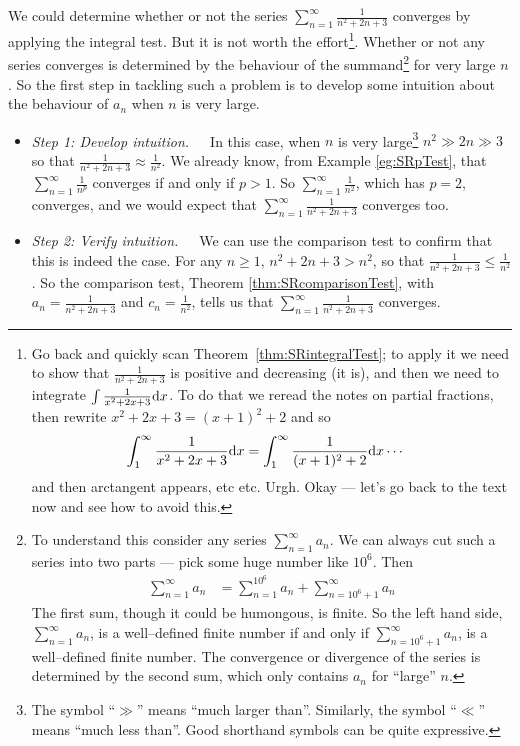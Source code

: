 \goodbreak
\begin{eg}[$\sum_{n=1}^\infty\frac{1}{n^2+2n+3}$]\label{eg:SRcomparisonTestA}
We could determine whether or not the series $\sum_{n=1}^\infty\frac{1}{n^2+2n+3}$
converges by applying the integral test. But it is not worth the effort\footnote{Go back and quickly scan
Theorem~\ref{thm:SRintegralTest}; to apply it we need to show that
$\frac{1}{n^2+2n+3}$ is  positive and decreasing (it is), and then
we need to integrate $\int \frac{1}{x^2+2x+3}\mathrm{d}x$. To do that
we reread the notes on partial fractions, then rewrite $x^2+2x+3
= (x+1)^2+2$ and so
\begin{align*}
  \int_1^\infty \frac{1}{x^2+2x+3}\mathrm{d}x
  &= \int_1^\infty \frac{1}{(x+1)^2+2}\mathrm{d}x \cdots
\end{align*}
and then arctangent appears,  etc etc. Urgh. Okay --- let's go
back to the text now and see how to avoid this.
}.
Whether or not any series converges is determined by the behaviour
of the summand\footnote{To understand this consider any series
$\sum_{n=1}^\infty a_n$. We can always cut such a series into
two parts --- pick some huge number like $10^6$. Then
\begin{align*}
\sum_{n=1}^\infty a_n
&= \sum_{n=1}^{10^6} a_n + \sum_{n=10^6+1}^\infty a_n
\end{align*}
The first sum, though it could be humongous, is finite. So
the left hand side, $\sum_{n=1}^\infty a_n$, is a well--defined finite
number if and only if $\sum_{n=10^6+1}^\infty a_n$, is a well--defined
finite number. The convergence or divergence of the series is
determined by the second sum, which  only contains $a_n$ for ``large'' $n$.}
for very large $n$. So the first step in tackling such
a problem is to develop some intuition about the behaviour of $a_n$ when
$n$ is very large.
\begin{itemize}
\item \emph{Step 1: Develop intuition.}\ \ \
In this case, when $n$ is very large\footnote{The symbol ``$\gg$''
means ``much larger than''. Similarly, the symbol ``$\ll$'' means ``much
less than''. Good shorthand symbols can be quite expressive.}
$n^2\gg 2n \gg 3$ so that  $\frac{1}{n^2+2n+3}\approx\frac{1}{n^2}$.
We already know, from Example \ref{eg:SRpTest}, that
$\sum_{n=1}^\infty\frac{1}{n^p}$ converges if and only if $p>1$.
So $\sum_{n=1}^\infty\frac{1}{n^2}$, which has $p=2$, converges, and
we would expect that
$\sum_{n=1}^\infty\frac{1}{n^2+2n+3}$ converges too.
\item \emph{Step 2: Verify intuition.}\ \ \
We can use the comparison test to confirm that this is indeed the case.
For any $n\ge 1$, $n^2+2n+3 > n^2$, so that
$\frac{1}{n^2+2n+3}\le\frac{1}{n^2}$. So the comparison test,
Theorem \ref{thm:SRcomparisonTest}, with $a_n=\frac{1}{n^2+2n+3}$ and
$c_n=\frac{1}{n^2}$, tells us that $\sum_{n=1}^\infty\frac{1}{n^2+2n+3}$
converges.
\end{itemize}
\end{eg}

